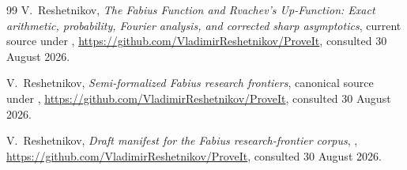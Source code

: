 \documentclass[11pt,oneside]{article}
\theoremstyle{definition}
\theoremstyle{remark}
\begin{document}
\begin{thebibliography}{99}
V.~Reshetnikov,
\newblock \emph{The Fabius Function and Rvachev's Up-Function: Exact arithmetic,
probability, Fourier analysis, and corrected sharp asymptotics},
\newblock current source under
,
\newblock \url{https://github.com/VladimirReshetnikov/ProveIt}, consulted 30 August 2026.

V.~Reshetnikov,
\newblock \emph{Semi-formalized Fabius research frontiers},
\newblock canonical source under
,
\newblock \url{https://github.com/VladimirReshetnikov/ProveIt}, consulted 30 August 2026.

V.~Reshetnikov,
\newblock \emph{Draft manifest for the Fabius research-frontier corpus},
\newblock {},
\newblock \url{https://github.com/VladimirReshetnikov/ProveIt}, consulted 30 August 2026.

\end{thebibliography}
\end{document}
